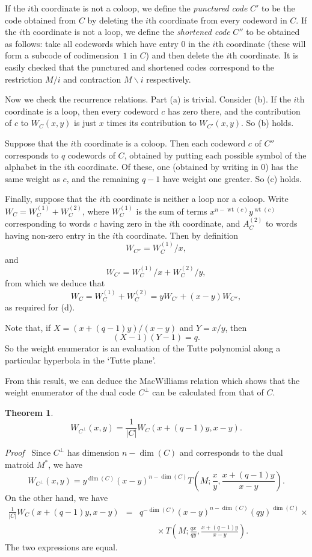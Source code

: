 \documentclass[12pt]{article}
\newtheorem{theorem}{Theorem}[section]
\newcommand{\head}[1]{\medbreak\noindent\textit{#1}\ }
\newcommand{\wt}{\mathop{\mathrm{wt}}}
\begin{document}
If the $i$th coordinate is not a coloop, we define the \emph{punctured
code} $C'$ to be the code obtained from $C$ by deleting the $i$th coordinate
from every codeword in $C$. If the $i$th coordinate is not a loop, we
define the \emph{shortened code} $C''$ to be obtained as follows: take
all codewords which have entry $0$ in the $i$th coordinate (these will
form a subcode of codimension~$1$ in $C$) and then delete the $i$th
coordinate. It is easily checked that the punctured and shortened
codes correspond to the restriction $M/i$ and contraction $M\backslash i$
respectively.

Now we check the recurrence relations. Part (a) is trivial. Consider (b).
If the $i$th coordinate is a loop, then every codeword $c$ has zero there,
and the contribution of $c$ to $W_C(x,y)$ is just $x$ times its
contribution to $W_{C'}(x,y)$. So (b) holds.

Suppose that the $i$th coordinate is a coloop. Then each codeword $c$ of
$C''$ corresponds to $q$ codewords of $C$, obtained by putting each possible
symbol of the alphabet in the $i$th coordinate. Of these, one (obtained
by writing in $0$) has the same weight as $c$, and the remaining $q-1$
have weight one greater. So (c) holds.

Finally, suppose that the $i$th coordinate is neither a loop nor a coloop.
Write $W_C=W_C^{(1)}+W_C^{(2)}$, where $W_C^{(1)}$ is the sum of terms
$x^{n-\wt(c)}y^{\wt(c)}$ corresponding to words $c$ having zero in the
$i$th coordinate, and $A_C^{(2)}$ to words having non-zero entry in the
$i$th coordinate. Then by definition
\[W_{C''}=W_C^{(1)}/x,\]
and
\[W_{C'}=W_C^{(1)}/x + W_C^{(2)}/y,\]
from which we deduce that
\[W_C=W_C^{(1)}+W_C^{(2)}=yW_{C'}+(x-y)W_{C''},\]
as required for (d).


\medbreak

Note that, if $X=(x+(q-1)y)/(x-y)$ and $Y=x/y$, then
\[(X-1)(Y-1)=q.\]
So the weight enumerator is an evaluation of the Tutte polynomial along
a particular hyperbola in the `Tutte plane'.

\medbreak

From this result, we can deduce the MacWilliams relation which shows that
the weight enumerator of the dual code $C^\bot$ can be calculated from
that of $C$.

\begin{theorem}
\[W_{C^\bot}(x,y)=\frac{1}{|C|}W_C(x+(q-1)y,x-y).\]
\end{theorem}

\head{Proof} Since $C^\bot$ has dimension $n-\dim(C)$ and corresponds to
the dual matroid $M^*$, we have
\[W_{C^\bot}(x,y)=y^{\dim(C)}(x-y)^{n-\dim(C)}
T\left(M;\frac{x}{y},\frac{x+(q-1)y}{x-y}\right).\]
On the other hand, we have
\begin{eqnarray*}
\frac{1}{|C|}W_C(x+(q-1)y,x-y)&=&q^{-\dim(C)}(x-y)^{n-\dim(C)}(qy)^{\dim(C)}
\times{}\\
&&\qquad{}\times T\left(M;\frac{qx}{qy},\frac{x+(q-1)y}{x-y}\right).
\end{eqnarray*}
The two expressions are equal.
\end{document}
